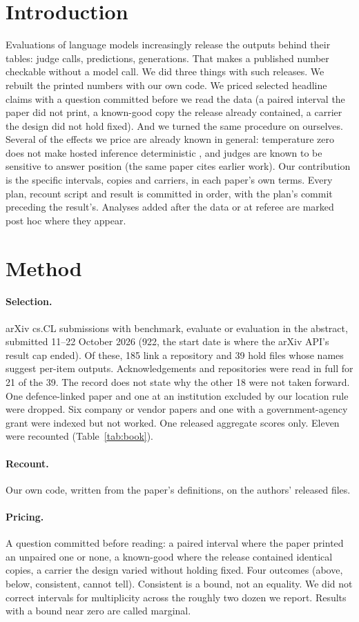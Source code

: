 \documentclass[11pt]{article}
\begin{document}
\section{Introduction}
Evaluations of language models increasingly release the outputs behind their tables: judge calls, predictions, generations. That makes a
published number checkable without a model call. We did three things with such releases. We rebuilt the printed numbers with our own code.
We priced selected headline claims with a question committed before we read the data (a paired interval the paper did not print, a known-good
copy the release already contained, a carrier the design did not hold fixed). And we turned the same procedure on ourselves. Several of the
effects we price are already known in general: temperature zero does not make hosted inference deterministic \citep{r2610_30512}, and
judges are known to be sensitive to answer position (the same paper cites earlier work). Our contribution is the specific intervals, copies and carriers, in each paper's own terms. Every plan,
recount script and result is committed in order, with the plan's commit preceding the result's. Analyses added after the data or at
referee are marked post hoc where they appear.

\section{Method}
\paragraph{Selection.} arXiv cs.CL submissions with benchmark, evaluate or evaluation in the abstract, submitted 11--22 October 2026 (922,
the start date is where the arXiv API's result cap ended). Of these, 185 link a repository and 39 hold files whose names suggest per-item
outputs. Acknowledgements and repositories were read in full for 21 of the 39. The record does not state why the other 18 were not taken forward. One defence-linked paper and one at an institution excluded by our location rule
were dropped. Six company or vendor papers and one with a government-agency grant were indexed but not worked. One released aggregate scores
only. Eleven were recounted (Table~\ref{tab:book}).
\paragraph{Recount.} Our own code, written from the paper's definitions, on the authors' released files.
\paragraph{Pricing.} A question committed before reading: a paired interval where the paper printed an unpaired one or none, a known-good where
the release contained identical copies, a carrier the design varied without holding fixed. Four outcomes (above, below, consistent, cannot
tell). Consistent is a bound, not an equality. We did not correct intervals for multiplicity across the roughly two dozen we report. Results
with a bound near zero are called marginal.
\end{document}
